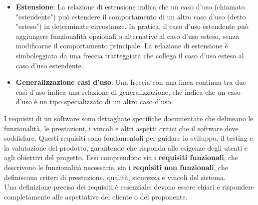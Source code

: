 \begin{itemize}
\begin{itemize}
		\item \textbf{Estensione}: La relazione di estensione indica che un caso d'uso (chiamato "estendente") può estendere il comportamento di un altro caso d'uso (detto "esteso") in determinate circostanze. In pratica, il caso d'uso estendente può aggiungere funzionalità opzionali o alternative al caso d'uso esteso, senza modificarne il comportamento principale. La relazione di estensione è simboleggiata da una freccia tratteggiata che collega il caso d'uso esteso al caso d'uso estendente.
		\item \textbf{Generalizzazione casi d'uso}: Una freccia con una linea continua tra due casi d'uso indica una relazione di generalizzazione, che indica che un caso d'uso è un tipo specializzato di un altro caso d'uso.
	\end{itemize}
\end{itemize}

I requisiti di un software sono dettagliate specifiche documentate che delineano le funzionalità, le prestazioni, i vincoli e altri aspetti critici che il software deve soddisfare. Questi requisiti sono fondamentali per guidare lo sviluppo, il testing e la valutazione del prodotto, garantendo che risponda alle esigenze degli utenti e agli obiettivi del progetto. Essi comprendono sia i \textbf{requisiti funzionali}, che descrivono le funzionalità necessarie, sia i \textbf{requisiti non funzionali}, che definiscono criteri di prestazione, qualità, sicurezza e vincoli del sistema.\\
Una definizione precisa dei requisiti è essenziale: devono essere chiari e rispondere completamente alle aspettative del cliente o del proponente.

